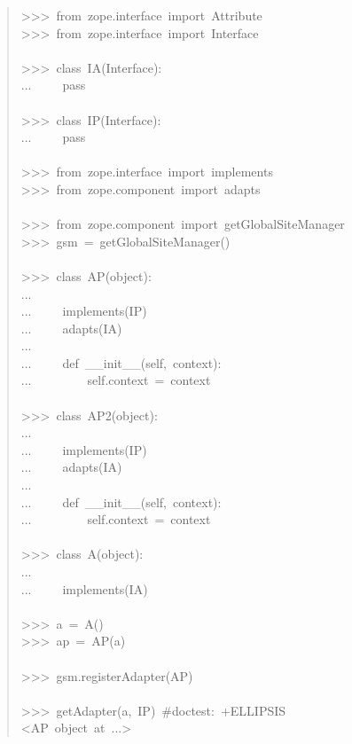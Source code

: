\documentclass[14pt,a4paper,openany,twoside,final]{extbook}
\begin{document}
\begin{quote}{\ttfamily \raggedright \noindent
>{}>{}>~from~zope.interface~import~Attribute\\
>{}>{}>~from~zope.interface~import~Interface\\
~\\
>{}>{}>~class~IA(Interface):\\
...~~~~~pass\\
~\\
>{}>{}>~class~IP(Interface):\\
...~~~~~pass\\
~\\
>{}>{}>~from~zope.interface~import~implements\\
>{}>{}>~from~zope.component~import~adapts\\
~\\
>{}>{}>~from~zope.component~import~getGlobalSiteManager\\
>{}>{}>~gsm~=~getGlobalSiteManager()\\
~\\
>{}>{}>~class~AP(object):\\
...\\
...~~~~~implements(IP)\\
...~~~~~adapts(IA)\\
...\\
...~~~~~def~\_\_init\_\_(self,~context):\\
...~~~~~~~~~self.context~=~context\\
~\\
>{}>{}>~class~AP2(object):\\
...\\
...~~~~~implements(IP)\\
...~~~~~adapts(IA)\\
...\\
...~~~~~def~\_\_init\_\_(self,~context):\\
...~~~~~~~~~self.context~=~context\\
~\\
>{}>{}>~class~A(object):\\
...\\
...~~~~~implements(IA)\\
~\\
>{}>{}>~a~=~A()\\
>{}>{}>~ap~=~AP(a)\\
~\\
>{}>{}>~gsm.registerAdapter(AP)\\
~\\
>{}>{}>~getAdapter(a,~IP)~\#doctest:~+ELLIPSIS\\
<AP~object~at~...>
}
\end{quote}
\end{document}

